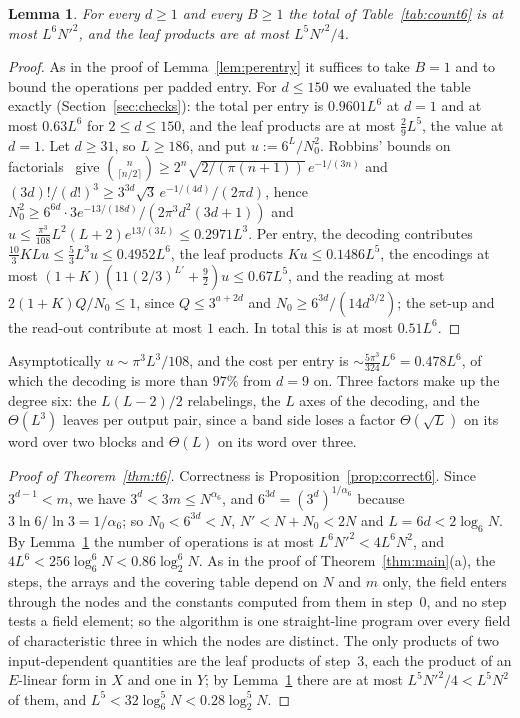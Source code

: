 \documentclass[11pt]{article}
\newtheorem{lemma}[theorem]{Lemma}
\theoremstyle{definition}
\theoremstyle{remark}
\newcommand{\Nz}{N_0}
\begin{document}
\begin{lemma}\label{lem:perentry6}
For every $d\ge1$ and every $B\ge1$ the total of Table~\ref{tab:count6} is at most $L^6N'^2$, and the leaf products are at most $L^5N'^2/4$.
\end{lemma}

\begin{proof}
As in the proof of Lemma~\ref{lem:perentry} it suffices to take $B=1$ and to bound the operations per padded entry. For $d\le150$ we evaluated the table exactly (Section~\ref{sec:checks}): the total per entry is $0.9601L^6$ at $d=1$ and at most $0.63L^6$ for $2\le d\le150$, and the leaf products are at most $\frac29L^5$, the value at $d=1$. Let $d\ge31$, so $L\ge186$, and put $u:=6^L/\Nz^2$. Robbins' bounds on factorials~\cite{Rob55} give $\binom n{\lceil n/2\rceil}\ge2^n\sqrt{2/(\pi(n+1))}\,e^{-1/(3n)}$ and $(3d)!/(d!)^3\ge3^{3d}\sqrt3\,e^{-1/(4d)}/(2\pi d)$, hence $\Nz^2\ge6^{6d}\cdot3e^{-13/(18d)}/(2\pi^3d^2(3d+1))$ and $u\le\frac{\pi^3}{108}L^2(L+2)e^{13/(3L)}\le0.2971L^3$. Per entry, the decoding contributes $\frac{10}3KLu\le\frac53L^3u\le0.4952L^6$, the leaf products $Ku\le0.1486L^5$, the encodings at most $(1+K)(11(2/3)^{L'}+\frac92)u\le0.67L^5$, and the reading at most $2(1+K)Q/\Nz\le1$, since $Q\le3^{a+2d}$ and $\Nz\ge6^{3d}/(14d^{3/2})$; the set-up and the read-out contribute at most $1$ each. In total this is at most $0.51L^6$.
\end{proof}

Asymptotically $u\sim\pi^3L^3/108$, and the cost per entry is $\sim\frac{5\pi^3}{324}L^6=0.478L^6$, of which the decoding is more than $97\%$ from $d=9$ on. Three factors make up the degree six: the $L(L-2)/2$ relabelings, the $L$ axes of the decoding, and the $\Theta(L^3)$ leaves per output pair, since a band side loses a factor $\Theta(\sqrt L)$ on its word over two blocks and $\Theta(L)$ on its word over three.

\begin{proof}[Proof of Theorem~\ref{thm:t6}]
Correctness is Proposition~\ref{prop:correct6}. Since $3^{d-1}<m$, we have $3^d<3m\le N^{\alpha_6}$, and $6^{3d}=(3^d)^{1/\alpha_6}$ because $3\ln6/\ln3=1/\alpha_6$; so $\Nz<6^{3d}<N$, $N'<N+\Nz<2N$ and $L=6d<2\log_6N$. By Lemma~\ref{lem:perentry6} the number of operations is at most $L^6N'^2<4L^6N^2$, and $4L^6<256\log_6^6N<0.86\log_2^6N$. As in the proof of Theorem~\ref{thm:main}(a), the steps, the arrays and the covering table depend on $N$ and $m$ only, the field enters through the nodes and the constants computed from them in step~0, and no step tests a field element; so the algorithm is one straight-line program over every field of characteristic three in which the nodes are distinct. The only products of two input-dependent quantities are the leaf products of step~3, each the product of an $E$-linear form in $X$ and one in $Y$; by Lemma~\ref{lem:perentry6} there are at most $L^5N'^2/4<L^5N^2$ of them, and $L^5<32\log_6^5N<0.28\log_2^5N$.
\end{proof}
\end{document}
